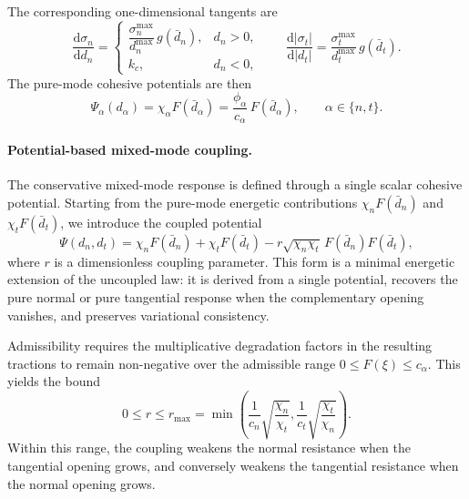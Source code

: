 \documentclass[smallextended]{svjour3}       %
\begin{document}
The corresponding one-dimensional tangents are
\begin{equation}
	\frac{\mathrm{d}\sigma_n}{\mathrm{d}d_n}=
	\begin{cases}
		\dfrac{\sigma_n^{\max}}{d_n^{\max}}\,g(\bar d_n), & d_n>0,\\[8pt]
		k_c, & d_n<0,
	\end{cases}
	\qquad
	\frac{\mathrm{d}|\sigma_t|}{\mathrm{d}|d_t|}
	=
	\frac{\sigma_t^{\max}}{d_t^{\max}}\,g(\bar d_t).
	\label{eq:pure_tangents}
\end{equation}
The pure-mode cohesive potentials are then
\begin{equation}
	\Psi_{\alpha}(d_{\alpha})
	=
	\chi_{\alpha}F(\bar d_{\alpha})
	=
	\frac{\phi_{\alpha}}{c_{\alpha}}\,F(\bar d_{\alpha}),
	\qquad
	\alpha\in\{n,t\}.
	\label{eq:pure_potentials}
\end{equation}

\paragraph{Potential-based mixed-mode coupling.}
The conservative mixed-mode response is defined through a single scalar
cohesive potential. Starting from the pure-mode energetic contributions
\(\chi_nF(\bar d_n)\) and \(\chi_tF(\bar d_t)\), we introduce the coupled
potential
\begin{equation}
	\Psi(d_n,d_t)
	=
	\chi_nF(\bar d_n)
	+
	\chi_tF(\bar d_t)
	-
	r\sqrt{\chi_n\chi_t}\,F(\bar d_n)F(\bar d_t),
	\label{eq:psi_mixed}
\end{equation}
where \(r\) is a dimensionless coupling parameter. This form is a minimal
energetic extension of the uncoupled law: it is derived from a single
potential, recovers the pure normal or pure tangential response when the
complementary opening vanishes, and preserves variational consistency.

Admissibility requires the multiplicative degradation factors in the
resulting tractions to remain non-negative over the admissible range
\(0\le F(\xi)\le c_{\alpha}\). This yields the bound
\begin{equation}
	0\le r\le r_{\max}
	=
	\min\!\left(
	\frac{1}{c_n}\sqrt{\frac{\chi_n}{\chi_t}},
	\frac{1}{c_t}\sqrt{\frac{\chi_t}{\chi_n}}
	\right).
	\label{eq:rmax}
\end{equation}
Within this range, the coupling weakens the normal resistance when the
tangential opening grows, and conversely weakens the tangential resistance
when the normal opening grows.
\end{document}
